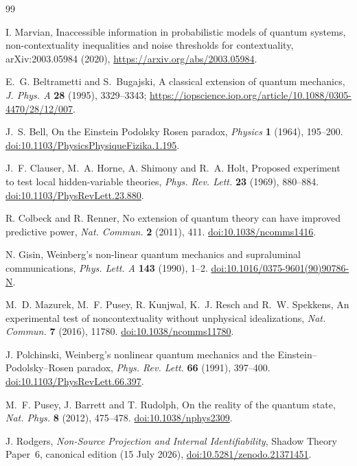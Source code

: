 \documentclass[11pt,a4paper]{article}
\theoremstyle{definition}
\theoremstyle{remark}\newtheorem{remark}[theorem]{Remark}
\begin{document}
\begin{thebibliography}{99}

 I. Marvian, Inaccessible information in probabilistic models of quantum systems, non-contextuality inequalities and noise thresholds for contextuality, arXiv:2003.05984 (2020), \url{https://arxiv.org/abs/2003.05984}.

 E.~G. Beltrametti and S.~Bugajski, A classical extension of quantum mechanics, \emph{J. Phys. A} \textbf{28} (1995), 3329--3343; \url{https://iopscience.iop.org/article/10.1088/0305-4470/28/12/007}.

 J.~S. Bell, On the Einstein Podolsky Rosen paradox, \emph{Physics} \textbf{1} (1964), 195--200. \href{https://doi.org/10.1103/PhysicsPhysiqueFizika.1.195}{doi:10.1103/PhysicsPhysiqueFizika.1.195}.


 J.~F. Clauser, M.~A. Horne, A. Shimony and R.~A. Holt, Proposed experiment to test local hidden-variable theories, \emph{Phys. Rev. Lett.} \textbf{23} (1969), 880--884. \href{https://doi.org/10.1103/PhysRevLett.23.880}{doi:10.1103/PhysRevLett.23.880}.

 R. Colbeck and R. Renner, No extension of quantum theory can have improved predictive power, \emph{Nat. Commun.} \textbf{2} (2011), 411. \href{https://doi.org/10.1038/ncomms1416}{doi:10.1038/ncomms1416}.


 N. Gisin, Weinberg's non-linear quantum mechanics and supraluminal communications, \emph{Phys. Lett. A} \textbf{143} (1990), 1--2. \href{https://doi.org/10.1016/0375-9601(90)90786-N}{doi:10.1016/0375-9601(90)90786-N}.

 M.~D. Mazurek, M.~F. Pusey, R. Kunjwal, K.~J. Resch and R.~W. Spekkens, An experimental test of noncontextuality without unphysical idealizations, \emph{Nat. Commun.} \textbf{7} (2016), 11780. \href{https://doi.org/10.1038/ncomms11780}{doi:10.1038/ncomms11780}.


 J. Polchinski, Weinberg's nonlinear quantum mechanics and the Einstein--Podolsky--Rosen paradox, \emph{Phys. Rev. Lett.} \textbf{66} (1991), 397--400. \href{https://doi.org/10.1103/PhysRevLett.66.397}{doi:10.1103/PhysRevLett.66.397}.

 M.~F. Pusey, J. Barrett and T. Rudolph, On the reality of the quantum state, \emph{Nat. Phys.} \textbf{8} (2012), 475--478. \href{https://doi.org/10.1038/nphys2309}{doi:10.1038/nphys2309}.

 J. Rodgers, \emph{Non-Source Projection and Internal Identifiability}, Shadow Theory Paper~6, canonical edition (15 July 2026), \href{https://doi.org/10.5281/zenodo.21371451}{doi:10.5281/zenodo.21371451}.


\end{thebibliography}
\end{document}
